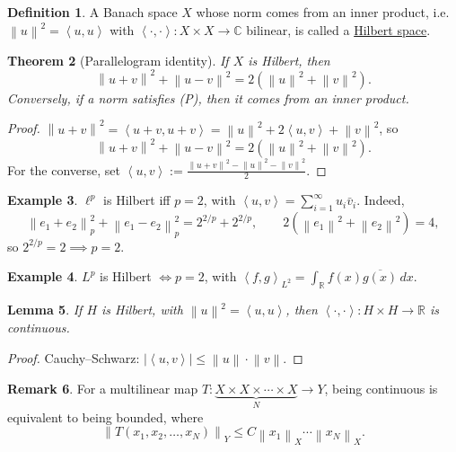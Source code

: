 \documentclass[12pt]{article}
\newcommand{\abs}[1]{\left| #1 \right|}
\newcommand{\norm}[1]{\left\| #1 \right\|}
\newcommand{\ip}[2]{\left\langle #1, #2 \right\rangle}
\newcommand{\R}{\mathbb{R}}
\newcommand{\C}{\mathbb{C}}
\newtheorem{thm}{Theorem}[section]
\newtheorem{lma}[thm]{Lemma}
\theoremstyle{definition}
\newtheorem{defn}[thm]{Definition}
\newtheorem{ex}[thm]{Example}
\newtheorem{rmk}[thm]{Remark}
\begin{document}
\begin{defn}
	A Banach space $X$ whose norm comes from an inner product, i.e.\ $\norm{u}^2 = \ip{u}{u}$ with $\ip{\cdot}{\cdot} : X \times X \to \C$ bilinear, is called a \underline{Hilbert space}.
\end{defn}

\begin{thm}[Parallelogram identity]
	If $X$ is Hilbert, then
	\begin{equation*}
		\norm{u+v}^2 + \norm{u-v}^2 = 2 \left( \norm{u}^2 + \norm{v}^2 \right). \tag{P}
	\end{equation*}
	Conversely, if a norm satisfies (P), then it comes from an inner product.
\end{thm}
\begin{proof}
	$\norm{u+v}^2 = \ip{u+v}{u+v} = \norm{u}^2 + 2\ip{u}{v} + \norm{v}^2$, so
	\begin{equation*}
		\norm{u+v}^2 + \norm{u-v}^2 = 2 \left( \norm{u}^2 + \norm{v}^2 \right).
	\end{equation*}
	For the converse, set $\ip{u}{v} := \frac{\norm{u+v}^2 - \norm{u}^2 - \norm{v}^2}{2}$.
\end{proof}

\begin{ex}
	$\ell^p$ is Hilbert iff $p = 2$, with $\ip{u}{v} = \sum_{i=1}^\infty u_i \bar{v}_i$.
	Indeed,
	\begin{equation*}
		\norm{e_1 + e_2}_p^2 + \norm{e_1 - e_2}_p^2 = 2^{2/p} + 2^{2/p}, \qquad 2 \left( \norm{e_1}^2 + \norm{e_2}^2 \right) = 4,
	\end{equation*}
	so $2^{2/p} = 2 \implies p = 2$.
\end{ex}

\begin{ex}
	$L^p$ is Hilbert $\iff p = 2$, with $\ip{f}{g}_{L^2} = \int_\R f(x) \overline{g(x)} \, dx$.
\end{ex}

\begin{lma}
	If $H$ is Hilbert, with $\norm{u}^2 = \ip{u}{u}$, then $\ip{\cdot}{\cdot} : H \times H \to \R$ is continuous.
\end{lma}
\begin{proof}
	Cauchy--Schwarz: $\abs{\ip{u}{v}} \leq \norm{u} \cdot \norm{v}$.
\end{proof}

\begin{rmk}
	For a multilinear map $T : \underbrace{X \times X \times \cdots \times X}_{N} \to Y$, being continuous is equivalent to being bounded, where
	\begin{equation*}
		\norm{T(x_1, x_2, \dots, x_N)}_Y \leq C \norm{x_1}_X \cdots \norm{x_N}_X.
	\end{equation*}
\end{rmk}
\end{document}
